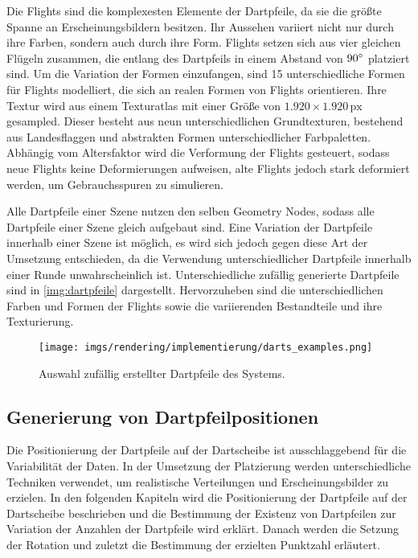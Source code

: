 Die Flights sind die komplexesten Elemente der Dartpfeile, da sie die größte Spanne an Erscheinungsbildern besitzen. Ihr Aussehen variiert nicht nur durch ihre Farben, sondern auch durch ihre Form. Flights setzen sich aus vier gleichen Flügeln zusammen, die entlang des Dartpfeils in einem Abstand von $90^{\circ}$ platziert sind. Um die Variation der Formen einzufangen, sind 15 unterschiedliche Formen für Flights modelliert, die sich an realen Formen von Flights orientieren. Ihre Textur wird aus einem Texturatlas mit einer Größe von $1.920 \times 1.920\,\text{px}$ gesampled. Dieser besteht aus neun unterschiedlichen Grundtexturen, bestehend aus Landesflaggen und abstrakten Formen unterschiedlicher Farbpaletten. Abhängig vom Altersfaktor wird die Verformung der Flights gesteuert, sodass neue Flights keine Deformierungen aufweisen, alte Flights jedoch stark deformiert werden, um Gebrauchsspuren zu simulieren.

\vspace{\baselineskip}
\newpage
\noindent Alle Dartpfeile einer Szene nutzen den selben Geometry Nodes, sodass alle Dartpfeile einer Szene gleich aufgebaut sind. Eine Variation der Dartpfeile innerhalb einer Szene ist möglich, es wird sich jedoch gegen diese Art der Umsetzung entschieden, da die Verwendung unterschiedlicher Dartpfeile innerhalb einer Runde unwahrscheinlich ist. Unterschiedliche zufällig generierte Dartpfeile sind in \autoref{img:dartpfeile} dargestellt. Hervorzuheben sind die unterschiedlichen Farben und Formen der Flights sowie die variierenden Bestandteile und ihre Texturierung.

\begin{figure}
    \centering
    \texttt{[image: imgs/rendering/implementierung/darts\_examples.png]}
    \caption{Auswahl zufällig erstellter Dartpfeile des Systems.}
    \label{img:dartpfeile}
\end{figure}

\subsection{Generierung von Dartpfeilpositionen}  %
\label{sec:wie_dartpfeil_positionen}

Die Positionierung der Dartpfeile auf der Dartscheibe ist ausschlaggebend für die Variabilität der Daten. In der Umsetzung der Platzierung werden unterschiedliche Techniken verwendet, um realistische Verteilungen und Erscheinungsbilder zu erzielen. In den folgenden Kapiteln wird die Positionierung der Dartpfeile auf der Dartscheibe beschrieben und die Bestimmung der Existenz von Dartpfeilen zur Variation der Anzahlen der Dartpfeile wird erklärt. Danach werden die Setzung der Rotation und zuletzt die Bestimmung der erzielten Punktzahl erläutert.


